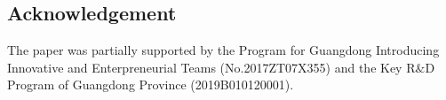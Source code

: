 \documentclass[11pt,a4paper]{article}
\begin{document}
\begin{spacing}{1.0}
\section{Acknowledgement}
The paper was partially supported by the Program for Guangdong Introducing Innovative and Enterpreneurial Teams (No.2017ZT07X355) and the Key R$\&$D Program of Guangdong Province (2019B010120001).

\end{spacing}
\newpage


\end{document}

